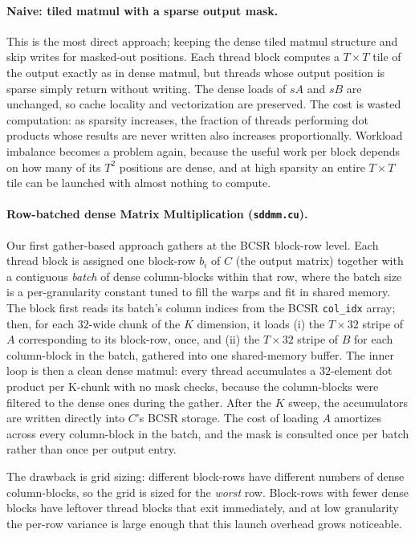 \documentclass[11pt]{article}
\begin{document}
\paragraph{Naive: tiled matmul with a sparse output mask.}
This is the most direct approach; keeping the dense tiled matmul structure and skip writes for masked-out positions. Each thread block computes a $T \times T$ tile of the output exactly as in dense matmul, but threads whose output position is sparse simply return without writing. The dense loads of $sA$ and $sB$ are unchanged, so cache locality and vectorization are preserved. The cost is wasted computation: as sparsity increases, the fraction of threads performing dot products whose results are never written also increases proportionally. Workload imbalance becomes a problem again, because the useful work per block depends on how many of its $T^2$ positions are dense, and at high sparsity an entire $T \times T$ tile can be launched with almost nothing to compute.

\paragraph{Row-batched dense Matrix Multiplication (\texttt{sddmm.cu}).}
Our first gather-based approach gathers at the BCSR block-row level. Each thread block is assigned one block-row $b_i$ of $C$ (the output matrix) together with a contiguous \emph{batch} of dense column-blocks within that row, where the batch size is a per-granularity constant tuned to fill the warps and fit in shared memory. The block first reads its batch's column indices from the BCSR \texttt{col\_idx} array; then, for each $32$-wide chunk of the $K$ dimension, it loads (i) the $T \times 32$ stripe of $A$ corresponding to its block-row, once, and (ii) the $T \times 32$ stripe of $B$ for each column-block in the batch, gathered into one shared-memory buffer. The inner loop is then a clean dense matmul: every thread accumulates a $32$-element dot product per K-chunk with no mask checks, because the column-blocks were filtered to the dense ones during the gather. After the $K$ sweep, the accumulators are written directly into $C$'s BCSR storage. The cost of loading $A$ amortizes across every column-block in the batch, and the mask is consulted once per batch rather than once per output entry.

The drawback is grid sizing: different block-rows have different numbers of dense column-blocks, so the grid is sized for the \emph{worst} row. Block-rows with fewer dense blocks have leftover thread blocks that exit immediately, and at low granularity the per-row variance is large enough that this launch overhead grows noticeable.
\end{document}
